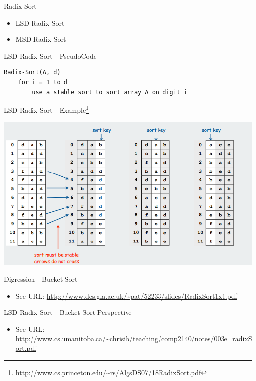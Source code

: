 \documentclass{beamer}
\begin{document}
\begin{frame}{Radix Sort}
\begin{itemize}
    \item LSD Radix Sort
    \item MSD Radix Sort
\end{itemize}
\end{frame}

\begin{frame}[fragile]{LSD Radix Sort - PseudoCode}
\begin{verbatim}
Radix-Sort(A, d)
    for i = 1 to d
        use a stable sort to sort array A on digit i
\end{verbatim}
\end{frame}


\begin{frame}{LSD Radix Sort - Example\footnote{\url{http://www.cs.princeton.edu/~rs/AlgsDS07/18RadixSort.pdf}}}
\begin{center}
    \includegraphics[scale=0.4]{radixSortEg1.png}
\end{center}
\end{frame}

\begin{frame}{Digression - Bucket Sort}
\begin{itemize}
\item See URL: \url{http://www.dcs.gla.ac.uk/~pat/52233/slides/RadixSort1x1.pdf} 
\end{itemize}
\end{frame}


\begin{frame}{LSD Radix Sort - Bucket Sort Perspective}
\begin{itemize}
   \item See URL: \url{http://www.cs.umanitoba.ca/~chrisib/teaching/comp2140/notes/003e_radixSort.pdf} 
\end{itemize}
\end{frame}
\end{document}
